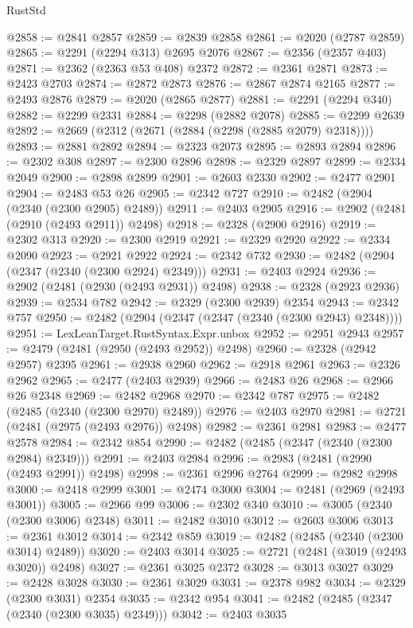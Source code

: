 \begin{lexlean}{RustStd}
\begin{coremodule}
@2858 := @2841 @2857
@2859 := @2839 @2858
@2861 := @2020 (@2787 @2859)
@2865 := @2291 (@2294 @313) @2695 @2076
@2867 := @2356 (@2357 @403)
@2871 := @2362 (@2363 @53 @408) @2372
@2872 := @2361 @2871
@2873 := @2423 @2703
@2874 := @2872 @2873
@2876 := @2867 @2874 @2165
@2877 := @2493 @2876
@2879 := @2020 (@2865 @2877)
@2881 := @2291 (@2294 @340)
@2882 := @2299 @2331
@2884 := @2298 (@2882 @2078)
@2885 := @2299 @2639
@2892 := @2669 (@2312 (@2671 (@2884 (@2298 (@2885 @2079) @2318))))
@2893 := @2881 @2892
@2894 := @2323 @2073
@2895 := @2893 @2894
@2896 := @2302 @308
@2897 := @2300 @2896
@2898 := @2329 @2897
@2899 := @2334 @2049
@2900 := @2898 @2899
@2901 := @2603 @2330
@2902 := @2477 @2901
@2904 := @2483 @53 @26
@2905 := @2342 @727
@2910 := @2482 (@2904 (@2340 (@2300 @2905) @2489))
@2911 := @2403 @2905
@2916 := @2902 (@2481 (@2910 (@2493 @2911)) @2498)
@2918 := @2328 (@2900 @2916)
@2919 := @2302 @313
@2920 := @2300 @2919
@2921 := @2329 @2920
@2922 := @2334 @2090
@2923 := @2921 @2922
@2924 := @2342 @732
@2930 := @2482 (@2904 (@2347 (@2340 (@2300 @2924) @2349)))
@2931 := @2403 @2924
@2936 := @2902 (@2481 (@2930 (@2493 @2931)) @2498)
@2938 := @2328 (@2923 @2936)
@2939 := @2534 @782
@2942 := @2329 (@2300 @2939) @2354
@2943 := @2342 @757
@2950 := @2482 (@2904 (@2347 (@2347 (@2340 (@2300 @2943) @2348))))
@2951 := LexLeanTarget.RustSyntax.Expr.unbox
@2952 := @2951 @2943
@2957 := @2479 (@2481 (@2950 (@2493 @2952)) @2498)
@2960 := @2328 (@2942 @2957) @2395
@2961 := @2938 @2960
@2962 := @2918 @2961
@2963 := @2326 @2962
@2965 := @2477 (@2403 @2939)
@2966 := @2483 @26
@2968 := @2966 @26 @2348
@2969 := @2482 @2968
@2970 := @2342 @787
@2975 := @2482 (@2485 (@2340 (@2300 @2970) @2489))
@2976 := @2403 @2970
@2981 := @2721 (@2481 (@2975 (@2493 @2976)) @2498)
@2982 := @2361 @2981
@2983 := @2477 @2578
@2984 := @2342 @854
@2990 := @2482 (@2485 (@2347 (@2340 (@2300 @2984) @2349)))
@2991 := @2403 @2984
@2996 := @2983 (@2481 (@2990 (@2493 @2991)) @2498)
@2998 := @2361 @2996 @2764
@2999 := @2982 @2998
@3000 := @2418 @2999
@3001 := @2474 @3000
@3004 := @2481 (@2969 (@2493 @3001))
@3005 := @2966 @99
@3006 := @2302 @340
@3010 := @3005 (@2340 (@2300 @3006) @2348)
@3011 := @2482 @3010
@3012 := @2603 @3006
@3013 := @2361 @3012
@3014 := @2342 @859
@3019 := @2482 (@2485 (@2340 (@2300 @3014) @2489))
@3020 := @2403 @3014
@3025 := @2721 (@2481 (@3019 (@2493 @3020)) @2498)
@3027 := @2361 @3025 @2372
@3028 := @3013 @3027
@3029 := @2428 @3028
@3030 := @2361 @3029
@3031 := @2378 @982
@3034 := @2329 (@2300 @3031) @2354
@3035 := @2342 @954
@3041 := @2482 (@2485 (@2347 (@2340 (@2300 @3035) @2349)))
@3042 := @2403 @3035

\end{coremodule}
\end{lexlean}
